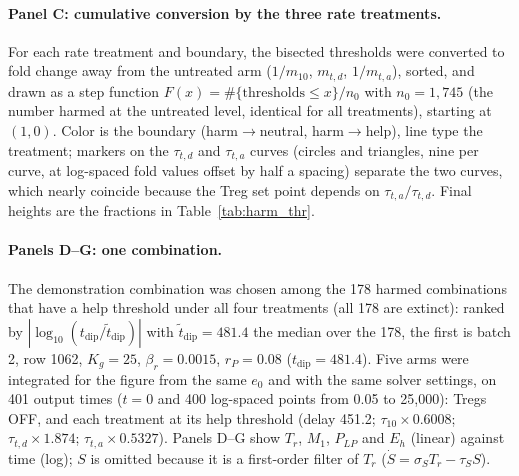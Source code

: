 \documentclass[11pt]{article}
\begin{document}
\paragraph{Panel C: cumulative conversion by the three rate treatments.}
For each rate treatment and boundary, the bisected thresholds were converted to
fold change away from the untreated arm ($1/m_{10}$, $m_{t,d}$, $1/m_{t,a}$), sorted, and drawn
as a step function $F(x)=\#\{\text{thresholds}\le x\}/n_0$ with $n_0=1{,}745$
(the number harmed at the untreated level, identical for all treatments), starting
at $(1,0)$. Color is the boundary (harm$\to$neutral, harm$\to$help), line type the
treatment; markers on the $\tau_{t,d}$ and $\tau_{t,a}$ curves (circles and
triangles, nine per curve, at log-spaced fold values offset by half a spacing) separate
the two curves, which nearly coincide because the Treg set point depends on
$\tau_{t,a}/\tau_{t,d}$. Final heights are the fractions in Table~\ref{tab:harm_thr}.

\paragraph{Panels D--G: one combination.}
The demonstration combination was chosen among the 178 harmed combinations that
have a help threshold under all four treatments (all 178 are extinct): ranked by
$|\log_{10}(t_{\mathrm{dip}}/\tilde t_{\mathrm{dip}})|$ with
$\tilde t_{\mathrm{dip}}=481.4$ the median over the 178, the first is batch 2,
row 1062, $K_g=25$, $\beta_r=0.0015$, $r_P=0.08$
($t_{\mathrm{dip}}=481.4$). Five arms were integrated for the figure from the
same $e_0$ and with the same solver settings, on 401 output times ($t=0$ and 400
log-spaced points from 0.05 to 25,000): Tregs OFF, and each treatment at its
help threshold (delay 451.2; $\tau_{10}\times0.6008$; $\tau_{t,d}\times1.874$;
$\tau_{t,a}\times0.5327$). Panels D--G show $T_r$, $M_1$, $P_{LP}$ and $E_h$
(linear) against time (log); $S$ is omitted because it is a first-order filter
of $T_r$ ($\dot S=\sigma_S T_r-\tau_S S$).
\end{document}
